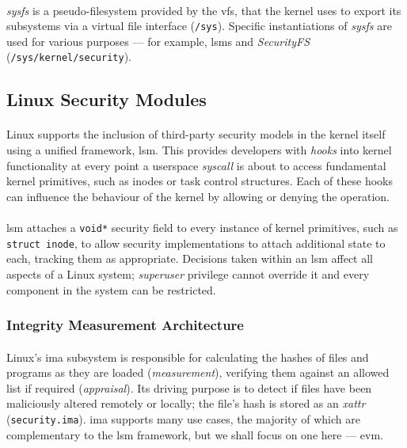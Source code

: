 \paragraph{} \textit{sysfs} is a pseudo-filesystem provided by the \acrshort{vfs}, that the kernel uses to export its subsystems via a virtual file interface (\texttt{/sys}). Specific instantiations of \textit{sysfs} are used for various purposes --- for example, \acrshort{lsm}s and \textit{SecurityFS} (\texttt{/sys/kernel/security}).



\subsection{Linux Security Modules}
\label{sec:lsm}

\paragraph{} Linux supports the inclusion of third-party security models in the kernel itself using a unified framework, \acrshort{lsm}. This provides developers with \textit{hooks} into kernel functionality at every point a userspace \textit{syscall} is about to access fundamental kernel primitives, such as inodes or task control structures. Each of these hooks can influence the behaviour of the kernel by allowing or denying the operation.

\paragraph{} \acrshort{lsm} attaches a \texttt{void*} security field to every instance of kernel primitives, such as \texttt{struct inode}, to allow security implementations to attach additional state to each, tracking them as appropriate. Decisions taken within an \acrshort{lsm} affect all aspects of a Linux system; \textit{superuser} privilege cannot override it and every component in the system can be restricted.


\subsubsection{Integrity Measurement Architecture}
\label{sec:ima}

\paragraph{} Linux's \acrshort{ima} subsystem is responsible for calculating the hashes of files and programs as they are loaded (\textit{measurement}), verifying them against an allowed list if required (\textit{appraisal}). Its driving purpose is to detect if files have been maliciously altered remotely or locally; the file's hash is stored as an \textit{xattr} (\texttt{security.ima}). \acrshort{ima} supports many use cases, the majority of which are complementary to the \acrshort{lsm} framework, but we shall focus on one here --- \acrshort{evm}.

